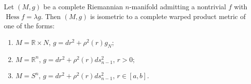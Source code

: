 \begin{theorem}
  \label{thm:pet-ch5-tashiro}
  Let $(M,g)$ be a complete Riemannian $n$-manifold admitting a nontrivial $f$
  with $\operatorname{Hess}f=\lambda g$. Then $(M,g)$ is isometric to a complete
  warped product metric of one of the forms:
  \begin{enumerate}
  \item[(1)] $M=\mathbb R\times N$, $g=dr^2+\rho^2(r)g_N$;
  \item[(2)] $M=\mathbb R^n$, $g=dr^2+\rho^2(r)ds_{n-1}^2$, $r>0$;
  \item[(3)] $M=S^n$, $g=dr^2+\rho^2(r)ds_{n-1}^2$, $r\in[a,b]$.
  \end{enumerate}
\end{theorem}
